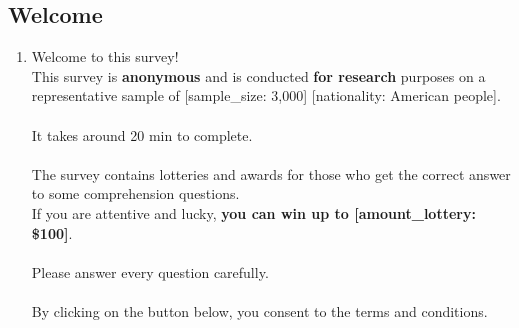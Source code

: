 \subsection*{Welcome} 
 \begin{enumerate} 
\item  \label{q:consent} Welcome to this survey!\\
This survey is \textbf{anonymous }and is conducted \textbf{for research} purposes on a representative sample of [sample\_size: 3,000] [nationality: American people].\\
~\\
It takes around 20 min to complete.\\
~\\
The survey contains lotteries and awards for those who get the correct answer to some comprehension questions.\\
If you are attentive and lucky, \textbf{you can win up to [amount\_lottery: \$100]}.\\
~\\
Please answer every question carefully.\\
~\\
By clicking on the button below, you consent to the terms and conditions.

\end{enumerate} 

